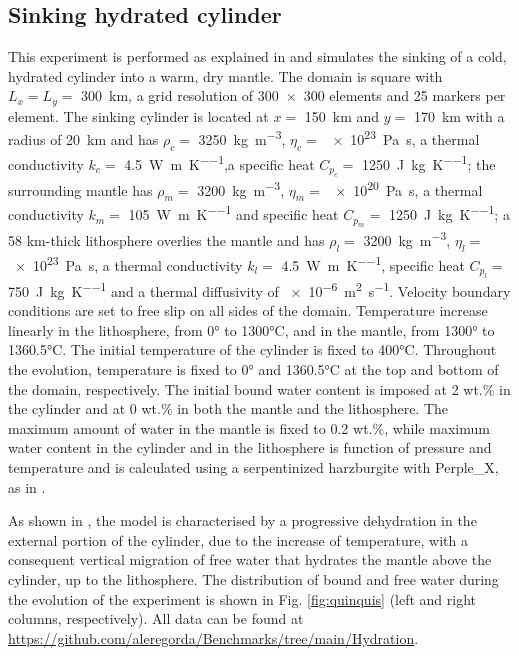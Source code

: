 \documentclass[hidelinks,10pt,a4paper]{article}
\begin{document}
\subsection{Sinking hydrated cylinder}\label{sec:quinquis}
This experiment is performed as explained in \citet{Quinquis2014} and simulates the sinking of a cold, hydrated cylinder into a warm, dry mantle. The domain
is square with $L_x=L_y=$ \SI{300}{\km}, a grid resolution of \num{300x300} elements and 25 markers per element. The sinking cylinder is located at $x=$
\SI{150}{\km} and $y=$ \SI{170}{\km} with a radius of \SI{20}{\km} and has $\rho_c=$ \SI{3250}{\kg\per\cubic\m}, $\eta_c=$ \SI{e23}{\pascal\s}, a thermal
conductivity $k_c=$ \SI{4.5}{\watt\per\m\per\kelvin},a specific heat $C_{p_c}=$ \SI{1250}{\joule\per\kg\per\kelvin}; the surrounding mantle has $\rho_m=$
\SI{3200}{\kg\per\cubic\m}, $\eta_m=$ \SI{e20}{\pascal\s}, a thermal conductivity $k_m=$ \SI{105}{\watt\per\m\per\kelvin} and specific heat $C_{p_m}=$
\SI{1250}{\joule\per\kg\per\kelvin}; a 58 km-thick lithosphere overlies the mantle and has $\rho_l=$ \SI{3200}{\kg\per\cubic\m}, $\eta_l=$ \SI{e23}{\pascal\s},
a thermal conductivity $k_l=$ \SI{4.5}{\watt\per\m\per\kelvin}, specific heat $C_{p_l}=$ \SI{750}{\joule\per\kg\per\kelvin} and a thermal diffusivity of
\SI{e-6}{\square\m\per\s}. Velocity boundary conditions are set to free slip on all sides of the domain. Temperature increase linearly in the lithosphere,
from 0° to 1300°C, and in the mantle, from 1300° to 1360.5°C. The initial temperature of the cylinder is fixed to 400°C. Throughout the evolution, temperature
is fixed to 0° and 1360.5°C at the top and bottom of the domain, respectively. The initial bound water content is imposed at 2 wt.\% in the cylinder and at
0 wt.\% in both the mantle and the lithosphere. The maximum amount of water in the mantle is fixed to 0.2 wt.\%, while maximum water content in the cylinder
and in the lithosphere is function of pressure and temperature and is calculated using a serpentinized harzburgite with Perple\_X, as in \citet{Quinquis2014}.

As shown in \citet{Quinquis2014}, the model is characterised by a progressive dehydration in the external portion of the cylinder, due to the increase of
temperature, with a consequent vertical migration of free water that hydrates the mantle above the cylinder, up to the lithosphere. The distribution of
bound and free water during the evolution of the experiment is shown in Fig. \ref{fig:quinquis} (left and right columns, respectively). 
All data can be found at \url{https://github.com/aleregorda/Benchmarks/tree/main/Hydration}.
\end{document}

